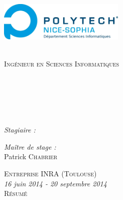 \begin{titlepage}
\begin{center}
\begin{minipage}[t]{0.49\textwidth}
\begin{flushleft}
  \end{flushleft}
\end{minipage} 
\begin{minipage}[t]{0.49\textwidth}
  \begin{flushright}
    \includegraphics [width=60mm]{images/Logo_polytech_SI.jpg} \\[0.2cm]
  \end{flushright}
\end{minipage} \\[2.0cm]
\vspace*{-0.8cm}
\textsc{\Large Ingénieur en Sciences Informatiques}\\[0.5cm]
\textsc{\Large \reportsubject}\\[0.5cm]
\HRule \\[0.4cm]
{\huge \bfseries \reporttitle}\\[0.4cm]
{\Large \bfseries \reportsubtitle}\\[0.2cm]
\HRule \\[1.5cm]
\vspace*{-0.8cm}
\begin{minipage}[t]{0.64\textwidth}
  \begin{flushleft} \large
    \emph{Stagiaire :}\\
    \reportauthor
  \end{flushleft}
\end{minipage}
\begin{minipage}[t]{0.35\textwidth}
  \begin{flushleft} \large
    \emph{Maître de stage :} \\
    Patrick \textsc{Chabrier}
  \end{flushleft}
  \vspace*{1.0cm}
\end{minipage}
\textsc{\Large Entreprise INRA (Toulouse)}\\[0.5cm]
{\emph{16 juin 2014 - 20 septembre 2014}}\\
\vspace*{0.8cm}
\textsc{\Large Résumé}\\[0.5cm]

\end{center}
\end{titlepage}
